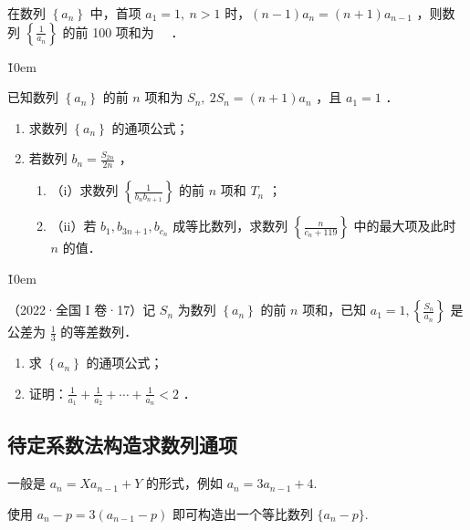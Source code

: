 \begin{example}
    在数列 $\left\{a_n\right\}$ 中，首项 $a_1=1, ~ n>1$ 时，$(n-1) a_n=(n+1) a_{n-1}$ ，则数列 $\left\{\frac{1}{a_n}\right\}$ 的前 100 项和为 \underline{$\quad$}．
\end{example}

\v{10em}


\begin{example}
    已知数列 $\left\{a_n\right\}$ 的前 $n$ 项和为 $S_n, ~ 2 S_n=(n+1) a_n$ ，且 $a_1=1$ ．
    \begin{enumerate}
        \item 求数列 $\left\{a_n\right\}$ 的通项公式；

        \item 若数列 $b_n=\frac{S_{2 n}}{2 n}$ ，
              \begin{enumerate}
                  \item （i）求数列 $\left\{\frac{1}{b_n b_{n+1}}\right\}$ 的前 $n$ 项和 $T_n$ ；
                  \item （ii）若 $b_1, b_{3 n+1}, b_{c_n}$ 成等比数列，求数列 $\left\{\frac{n}{c_n+119}\right\}$ 中的最大项及此时 $n$ 的值．
              \end{enumerate}
    \end{enumerate}
\end{example}

\v{10em}

\begin{example}
    （2022·全国 I 卷·17）记 $S_n$ 为数列 $\left\{a_n\right\}$ 的前 $n$ 项和，已知 $a_1=1,\left\{\frac{S_n}{a_n}\right\}$ 是公差为 $\frac{1}{3}$ 的等差数列．
    \begin{enumerate}
        \item 求 $\left\{a_n\right\}$ 的通项公式；
        \item 证明：$\frac{1}{a_1}+\frac{1}{a_2}+\cdots+\frac{1}{a_n}<2$ ．
    \end{enumerate}
\end{example}

\vspace{10em}

\subsection{待定系数法构造求数列通项}

\begin{theorem}[待定系数构造等比数列]
    一般是 $a_n = Xa_{n-1} + Y$ 的形式，例如 $a_n = 3 a_{n-1} + 4$.

    使用 $a_n - p = 3(a_{n-1} - p)$ 即可构造出一个等比数列 $\{{a_n} - p\}$.
\end{theorem}

